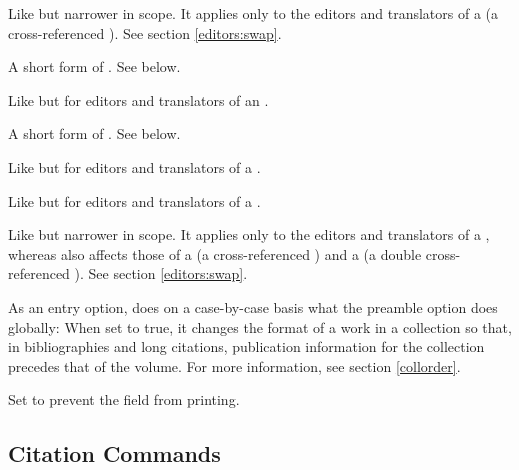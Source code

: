 \documentclass[11pt,letterpaper,oneside]{article}
\begin{document}
\begin{optionlist}
Like  but narrower in scope. It applies only to the
editors and translators of a  (a cross-referenced
). See section \ref{editors:swap}.


A short form of . See below.


Like  but for editors and translators of an
.


A short form of . See below.


Like  but for editors and translators of a
.


Like  but for editors and translators of a
.


Like  but narrower in scope. It applies only to the
editors and translators of a , whereas
 also affects those of a  (a
cross-referenced ) and a  (a
double cross-referenced ). See section
\ref{editors:swap}.


\noindent As an entry option,  does on a case-by-case
basis what the  preamble option does globally: When set
to true, it changes the format of a work in a collection so that, in
bibliographies and long citations, publication information for the
collection precedes that of the volume. For more information, see
section \ref{collorder}.


\noindent Set  to prevent the  field from
printing.

\end{optionlist}

\subsection{Citation Commands}
\end{document}
